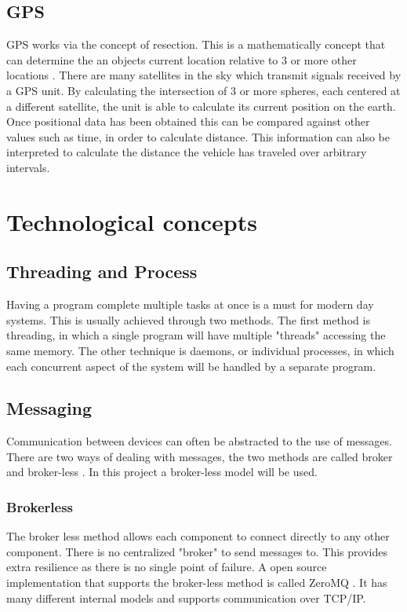 \subsection{GPS}

GPS works via the concept of resection.  This is a mathematically concept that can determine the an objects current location relative to 3 or more other locations \cite{intro_to_gps}. There are many satellites in the sky which transmit signals received by a GPS unit. By calculating the intersection of 3 or more spheres, each centered at a different satellite, the unit is able to calculate its current position on the earth. Once positional data has been obtained this can be compared against other values such as time, in order to calculate distance. This information can also be interpreted to calculate the distance the vehicle has traveled over arbitrary intervals.

\section{Technological concepts}

\subsection{Threading and Process}

Having a program complete multiple tasks at once is a must for modern day systems. This is usually achieved through two methods. The first method is threading, in which a single program will have multiple "threads" accessing the same memory. The other technique is daemons, or individual processes, in which each concurrent aspect of the system will be handled by a separate program.

\subsection{Messaging}

Communication between devices can often be abstracted to the use of messages. There are two ways of dealing with messages, the two methods are called broker and broker-less \cite{zeromq_broker} . In this project a broker-less model will be used.

\subsubsection{Brokerless}

The broker less method allows each component to connect directly to any other component. There is no centralized "broker" to send messages to. This provides extra resilience as there is no single point of failure. A open source implementation that supports the broker-less method is called ZeroMQ \cite{zeromq_guide}. It has many different internal models and supports communication over TCP/IP.